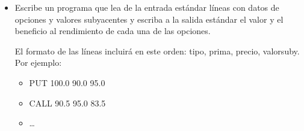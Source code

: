 \begin{itemize}
\begin{itemize}
\begin{itemize}
  \end{itemize}

\end{itemize}

\item Escribe un programa que lea de la entrada estándar líneas con datos de opciones
      y valores subyacentes y escriba a la salida estándar el valor y el beneficio al
      rendimiento de cada una de las opciones.

      El formato de las líneas incluirá en este orden: tipo, prima, precio, valorsuby.
      Por ejemplo:

  \begin{itemize}

    \item PUT 100.0 90.0 95.0
    \item CALL 90.5 95.0 83.5
    \item \ldots

  \end{itemize}

\end{itemize}
